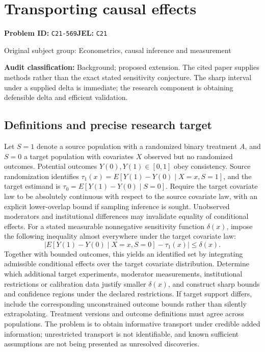 \documentclass[11pt,a4paper]{article}
\begin{document}
\section*{Transporting causal effects}
\textbf{Problem ID:} \texttt{C21-569}\quad \textbf{JEL:} \texttt{C21}\par
\label{problem:OP-0420}
{\sffamily\small\color{muted}Original subject group: Econometrics, causal inference and measurement\par}
\label{definitions:problem:30007702}
\textbf{Audit classification:} Background; proposed extension. The cited paper supplies methods rather than the exact stated sensitivity conjecture. The sharp interval under a supplied delta is immediate; the research component is obtaining defensible delta and efficient validation.
\subsection*{Definitions and precise research target}
Let \(S=1\) denote a source population with a randomized binary treatment \(A\), and \(S=0\) a target population with covariates \(X\) observed but no randomized outcomes. Potential outcomes \(Y(0),Y(1)\in[0,1]\) obey consistency. Source randomization identifies \(\tau_1(x)=E[Y(1)-Y(0)\mid X=x,S=1]\), and the target estimand is \(\tau_0=E[Y(1)-Y(0)\mid S=0]\). Require the target covariate law to be absolutely continuous with respect to the source covariate law, with an explicit lower-overlap bound if sampling inference is sought. Unobserved moderators and institutional differences may invalidate equality of conditional effects. For a stated measurable nonnegative sensitivity function \(\delta(x)\), impose the following inequality almost everywhere under the target covariate law:
\[
|E[Y(1)-Y(0)\mid X=x,S=0]-\tau_1(x)|\leq\delta(x).
\]
Together with bounded outcomes, this yields an identified set by integrating admissible conditional effects over the target covariate distribution. Determine which additional target experiments, moderator measurements, institutional restrictions or calibration data justify smaller \(\delta(x)\), and construct sharp bounds and confidence regions under the declared restrictions. If target support differs, include the corresponding unconstrained outcome bounds rather than silently extrapolating. Treatment versions and outcome definitions must agree across populations. The problem is to obtain informative transport under credible added information; unrestricted transport is not identifiable, and known sufficient assumptions are not being presented as unresolved discoveries.
\end{document}
